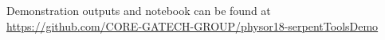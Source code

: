 \item Demonstration outputs and notebook can be found at \url{https://github.com/CORE-GATECH-GROUP/physor18-serpentToolsDemo} 
